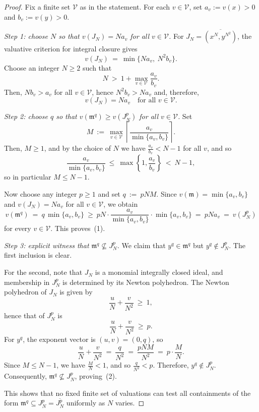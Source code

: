\documentclass[12pt]{amsart}
\newcommand{\m}{\mathfrak m}
\theoremstyle{plain}
\theoremstyle{definition}
\numberwithin{equation}{section}
\begin{document}
\begin{proof}
	Fix a finite set $\mathcal V$ as in the statement.  For each $v\in\mathcal V$, set
	$a_v:=v(x)>0$ and $b_v:=v(y)>0$.
	
	\smallskip\noindent
	\emph{Step 1: choose $N$ so that $v(J_N)=Na_v$ for all $v\in\mathcal V$.}
	For $J_N=\overline{(x^N,y^{N^2})}$, the valuative criterion for integral closure gives
	\[
	v(J_N)\ =\ \min\{N a_v,\ N^2 b_v\}.
	\]
	Choose an integer $N\ge 2$ such that
	\[
	N\ >\ 1+\max_{v\in\mathcal V}\frac{a_v}{b_v}.
	\]
	Then, $N b_v>a_v$ for all $v\in\mathcal V$, hence $N^2 b_v>Na_v$ and, therefore,
	\[
	v(J_N)=Na_v\quad\text{for all }v\in\mathcal V.
	\]
	
	\smallskip\noindent
	\emph{Step 2: choose $q$ so that $v(\m^q)\ge v(J_N^p)$ for all $v\in\mathcal V$.}
	Set
	\[
	M\ :=\ \max_{v\in\mathcal V}\left\lceil \frac{a_v}{\min\{a_v,b_v\}}\right\rceil.
	\]
	Then, $M\ge 1$, and by the choice of $N$ we have $\frac{a_v}{b_v}<N-1$ for all $v$, and so
	\[
	\frac{a_v}{\min\{a_v,b_v\}}\ \le\ \max\left\{1,\frac{a_v}{b_v}\right\}\ <\ N-1,
	\]
	so in particular $M\le N-1$.
	
	Now choose any integer $p\ge 1$ and set $q\ :=\ p N M.$
	Since $v(\m)=\min\{a_v,b_v\}$ and $v(J_N)=Na_v$ for all $v\in\mathcal V$, we obtain
	\[
	v(\m^q)\ =\ q\,\min\{a_v,b_v\}\ \ge\ pN\cdot \frac{a_v}{\min\{a_v,b_v\}}\cdot \min\{a_v,b_v\}
	\ =\ pN a_v\ =\ v(J_N^p)
	\]
	for every $v\in\mathcal V$.  This proves~(1).
	
	\smallskip\noindent
	\emph{Step 3: explicit witness that $\m^q\not\subseteq J_N^p$.}
	We claim that $y^q\in\m^q$ but $y^q\notin J_N^p$.  The first inclusion is clear.
	
	For the second, note that $J_N$ is a monomial integrally closed ideal, and membership in $J_N^p$
	is determined by its Newton polyhedron.  The Newton polyhedron of $J_N$ is given by
	\[
	\frac{u}{N}+\frac{v}{N^2}\ \ge\ 1,
	\]
	hence that of $J_N^p$ is
	\[
	\frac{u}{N}+\frac{v}{N^2}\ \ge\ p.
	\]
	For $y^q$, the exponent vector is $(u,v)=(0,q)$, so
	\[
	\frac{u}{N}+\frac{v}{N^2}\ =\ \frac{q}{N^2}\ =\ \frac{pNM}{N^2}\ =\ p\cdot\frac{M}{N}.
	\]
	Since $M\le N-1$, we have $\frac{M}{N}<1$, and so $\frac{q}{N^2}<p$. Therefore, $y^q\notin J_N^p$.
	Consequently, $\m^q\not\subseteq J_N^p$, proving~(2).
	
	This shows that no fixed finite set of valuations can test all containments of the form
	$\m^q\subseteq J_N^p = \overline{J_N^p}$ uniformly as $N$ varies.
\end{proof}
\end{document}
